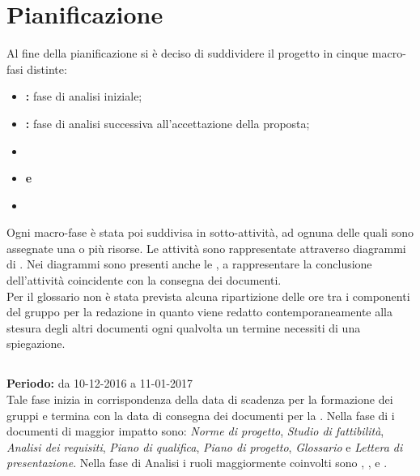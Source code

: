 \section{Pianificazione}

Al fine della pianificazione si è deciso di suddividere il progetto in cinque macro-fasi distinte:
\begin{itemize}
\item \textbf{\AR:} fase di analisi iniziale;
\item \textbf{\AD:} fase di analisi successiva all'accettazione della proposta;
\item \textbf{\PA}
\item \textbf{\PD e \Cod}
\item \textbf{\VV}
\end{itemize}
Ogni macro-fase è stata poi suddivisa in sotto-attività, ad ognuna delle quali sono assegnate una o più risorse. Le attività sono rappresentate attraverso diagrammi di . Nei diagrammi sono presenti anche le , a rappresentare la conclusione dell'attività coincidente con la consegna dei documenti. \\
Per il glossario non è stata prevista alcuna ripartizione delle ore tra i componenti del gruppo per la redazione in quanto viene redatto contemporaneamente alla stesura degli altri documenti ogni qualvolta un termine necessiti di una spiegazione.

\subsection{\AR}
\textbf{Periodo:} da 10-12-2016 a 11-01-2017 \\
Tale fase inizia in corrispondenza della data di scadenza per la formazione dei gruppi e termina con la data di consegna dei documenti per la \RR. Nella fase di \AR i documenti di maggior impatto sono: \textit{Norme di progetto}, \textit{Studio di fattibilità}, \textit{Analisi dei requisiti}, \textit{Piano di qualifica}, \textit{Piano di progetto}, \textit{Glossario} e \textit{Lettera di presentazione}.
Nella fase di Analisi i ruoli maggiormente coinvolti sono \Analista, \Responsabile, \Amministratore e \Verificatore.


